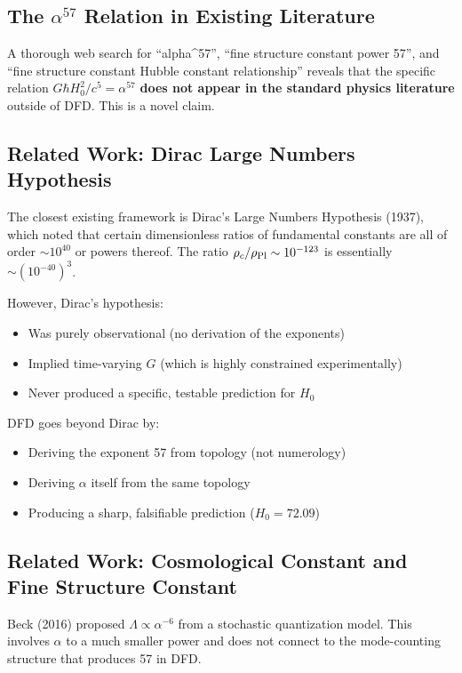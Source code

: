 \documentclass[11pt]{article}
\begin{document}
\subsection{The $\alpha^{57}$ Relation in Existing Literature}

A thorough web search for ``alpha\^{}57'', ``fine structure constant
power 57'', and ``fine structure constant Hubble constant relationship''
reveals that the specific relation $G\hbar H_0^2/c^5 = \alpha^{57}$
\textbf{does not appear in the standard physics literature} outside of DFD.
This is a novel claim.

\subsection{Related Work: Dirac Large Numbers Hypothesis}

The closest existing framework is Dirac's Large Numbers Hypothesis (1937),
which noted that certain dimensionless ratios of fundamental constants
are all of order $\sim 10^{40}$ or powers thereof. The ratio
$\rho_c/\rho_{\rm Pl} \sim 10^{-123}$ is essentially $\sim (10^{-40})^3$.

However, Dirac's hypothesis:
\begin{itemize}
\item Was purely observational (no derivation of the exponents)
\item Implied time-varying $G$ (which is highly constrained experimentally)
\item Never produced a specific, testable prediction for $H_0$
\end{itemize}

DFD goes beyond Dirac by:
\begin{itemize}
\item Deriving the exponent 57 from topology (not numerology)
\item Deriving $\alpha$ itself from the same topology
\item Producing a sharp, falsifiable prediction ($H_0 = 72.09$)
\end{itemize}

\subsection{Related Work: Cosmological Constant and Fine Structure Constant}

Beck (2016) proposed $\Lambda \propto \alpha^{-6}$ from a stochastic
quantization model. This involves $\alpha$ to a much smaller power and
does not connect to the mode-counting structure that produces 57 in DFD.
\end{document}
